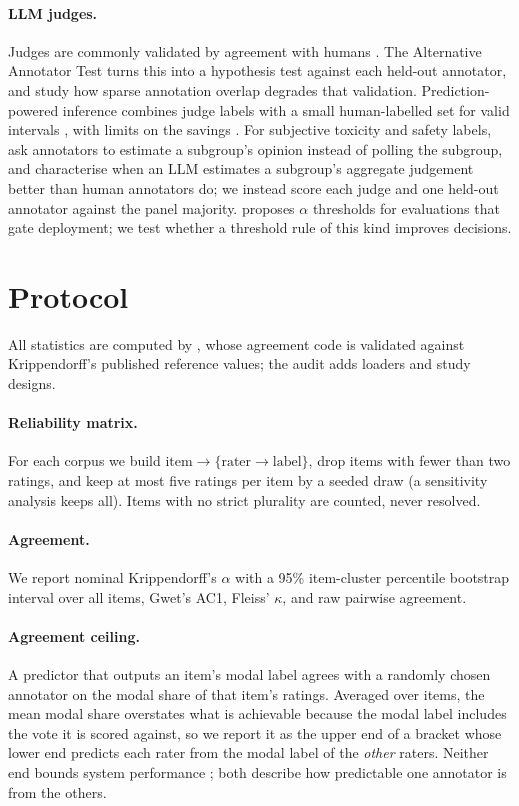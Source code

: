 \documentclass[11pt]{article}
\begin{document}
\paragraph{LLM judges.} Judges are commonly validated by agreement with humans \citep{zheng2023judging,chiang2023large,bavaresco2025llms}. The Alternative Annotator Test \citep{calderon2025alternative} turns this into a hypothesis test against each held-out annotator, and \citet{li2026llm} study how sparse annotation overlap degrades that validation. Prediction-powered inference combines judge labels with a small human-labelled set for valid intervals \citep{angelopoulos2023prediction,boyeau2025autoeval}, with limits on the savings \citep{dorner2025limits}. For subjective toxicity and safety labels, \citet{duan2025exploring} ask annotators to estimate a subgroup's opinion instead of polling the subgroup, and \citet{amin2026fallback} characterise when an LLM estimates a subgroup's aggregate judgement better than human annotators do; we instead score each judge and one held-out annotator against the panel majority. \citet{caban2026measurement} proposes $\alpha$ thresholds for evaluations that gate deployment; we test whether a threshold rule of this kind improves decisions.

\section{Protocol}
\label{sec:protocol}
All statistics are computed by \libintro, whose agreement code is validated against Krippendorff's published reference values; the audit adds loaders and study designs.

\paragraph{Reliability matrix.} For each corpus we build $\text{item}\to\{\text{rater}\to\text{label}\}$, drop items with fewer than two ratings, and keep at most five ratings per item by a seeded draw (a sensitivity analysis keeps all). Items with no strict plurality are counted, never resolved.

\paragraph{Agreement.} We report nominal Krippendorff's $\alpha$ with a 95\% item-cluster percentile bootstrap interval over all items, Gwet's AC1, Fleiss' $\kappa$, and raw pairwise agreement.

\paragraph{Agreement ceiling.} A predictor that outputs an item's modal label agrees with a randomly chosen annotator on the modal share of that item's ratings. Averaged over items, the mean modal share overstates what is achievable because the modal label includes the vote it is scored against, so we report it as the upper end of a bracket whose lower end predicts each rater from the modal label of the \emph{other} raters. Neither end bounds system performance \citep{boguslav2017inter}; both describe how predictable one annotator is from the others.
\end{document}
